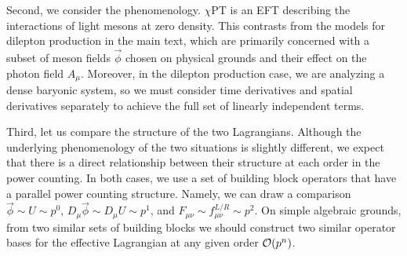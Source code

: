 Second, we consider the phenomenology. $\chi$PT is an EFT describing the interactions of light mesons at zero density. This contrasts from the models for dilepton production in the main text, which are primarily concerned with a subset of meson fields $\vec{\phi}$ chosen on physical grounds and their effect on the photon field $A_\mu$. Moreover, in the dilepton production case, we are analyzing a dense baryonic system, so we must consider time derivatives and spatial derivatives separately to achieve the full set of linearly independent terms.

Third, let us compare the structure of the two Lagrangians. Although the underlying phenomenology of the two situations is slightly different, we expect that there is a direct relationship between their structure at each order in the power counting. In both cases, we use a set of building block operators that have a parallel power counting structure. Namely, we can draw a comparison $\vec \phi \sim U\sim p^0$, $D_\mu \vec\phi \sim D_\mu U \sim p^1$, and $F_{\mu\nu} \sim f_{\mu\nu}^{L/R}\sim p^2$. On simple algebraic grounds, from two similar sets of building blocks we should construct two similar operator bases for the effective Lagrangian at any given order $\mathcal{O}(p^{n})$.

